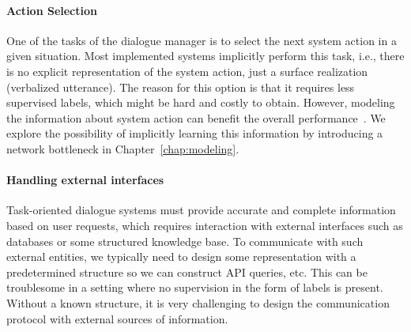 \paragraph{Action Selection}
One of the tasks of the dialogue manager is to select the next system action in a given situation.
Most implemented systems implicitly perform this task, i.e., there is no explicit representation of the system action, just a surface realization (verbalized utterance).
The reason for this option is that it requires less supervised labels, which might be hard and costly to obtain.
However, modeling the information about system action can benefit the overall performance~\cite{DBLP:conf/aaai/LiangTCY20}.
We explore the possibility of implicitly learning this information by introducing a network bottleneck in Chapter~\ref{chap:modeling}.

\paragraph{Handling external interfaces}
Task-oriented dialogue systems must provide accurate and complete information based on user requests, which requires interaction with external interfaces such as databases or some structured knowledge base.
To communicate with such external entities, we typically need to design some representation with a predetermined structure so we can construct API queries, etc.
This can be troublesome in a setting where no supervision in the form of labels is present.
Without a known structure, it is very challenging to design the communication protocol with external sources of information.


